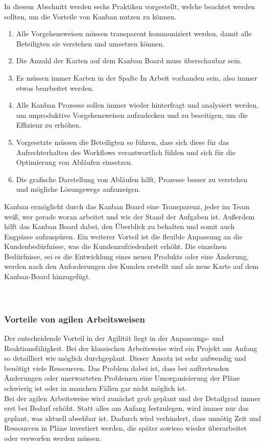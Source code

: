 \documentclass[ngerman]{seminarvorlage}
\begin{document}
In diesem Abschnitt werden sechs Praktiken vorgestellt, welche beachtet werden sollten, um die Vorteile von Kanban nutzen zu können.\cite{Refa.}
\begin{enumerate}
\item Alle Vorgehensweisen müssen transparent kommuniziert werden, damit alle Beteiligten sie verstehen und umsetzen können.
\item Die Anzahl der Karten auf dem Kanban Board muss überschaubar sein.
\item Es müssen immer Karten in der Spalte \glqq In Arbeit\grqq\: vorhanden sein, also immer etwas bearbeitet werden.
\item Alle Kanban Prozesse sollen immer wieder hinterfragt und analysiert werden, um unproduktive Vorgehensweisen aufzudecken und zu beseitigen, um die Effizienz zu erhöhen.
\item Vorgesetzte müssen die Beteiligten so führen, dass sich diese für das Aufrechterhalten des Workflows verantwortlich fühlen und sich für die Optimierung von Abläufen einsetzen.
\item Die grafische Darstellung von Abläufen hilft, Prozesse besser zu verstehen und mögliche Lösungswege aufzuzeigen.
\end{enumerate}

Kanban ermöglicht durch das Kanban Board eine Transparenz, jeder im Team weiß, wer gerade woran arbeitet und wie der Stand der Aufgaben ist. Außerdem hilft das Kanban Board dabei, den Überblick zu behalten und somit auch Engpässe aufzuspüren. Ein weiterer Vorteil ist die flexible Anpassung an die Kundenbedürfnisse, was die Kundenzufriedenheit erhöht. Die einzelnen Bedürfnisse, sei es die Entwicklung eines neuen Produkts oder eine Änderung, werden nach den Anforderungen des Kunden erstellt und als neue Karte auf dem Kanban-Board hinzugefügt.\\\\\\
\subsubsection{Vorteile von agilen Arbeitsweisen}
Der entscheidende Vorteil in der Agilität liegt in der Anpassungs- und Reaktionsfähigkeit. Bei der klassischen Arbeitsweise wird ein Projekt am Anfang so detailliert wie möglich durchgeplant. Dieser Ansatz ist sehr aufwendig und benötigt viele Ressourcen. Das Problem dabei ist, dass bei auftretenden Änderungen oder unerwarteten Problemen eine Umorganisierung der Pläne schwierig ist oder in manchen Fällen gar nicht möglich ist.\\
Bei der agilen Arbeitsweise wird zunächst grob geplant und der Detailgrad immer erst bei Bedarf erhöht. Statt alles am Anfang festzulegen, wird immer nur das geplant, was aktuell absehbar ist. Dadurch wird verhindert, dass unnötig Zeit und Ressourcen in Pläne investiert werden, die später sowieso wieder überarbeitet oder verworfen werden müssen.\cite{Theobald.2021}
\end{document}
